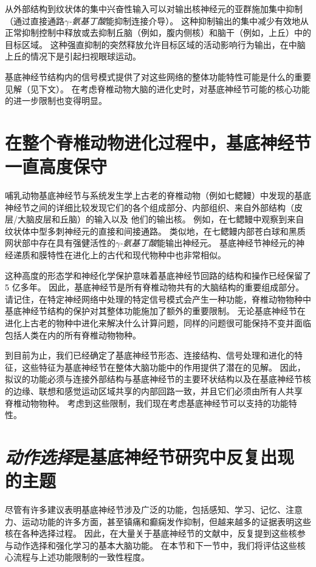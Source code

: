 从外部结构到纹状体的集中兴奋性输入可以对输出核神经元的亚群施加集中抑制（通过直接通路\textit{$\gamma$-氨基丁酸}能抑制连接介导）。
这种抑制输出的集中减少有效地从正常抑制控制中释放或去抑制丘脑（例如，腹内侧核）和脑干（例如，上丘）中的目标区域。
这种强直抑制的突然释放允许目标区域的活动影响行为输出，在中脑上丘的情况下是引起扫视眼球运动。


基底神经节结构内的信号模式提供了对这些网络的整体功能特性可能是什么的重要见解（见下文）。
在考虑脊椎动物大脑的进化史时，对基底神经节可能的核心功能的进一步限制也变得明显。



\section{在整个脊椎动物进化过程中，基底神经节一直高度保守}

哺乳动物基底神经节与系统发生学上古老的脊椎动物（例如七鳃鳗）中发现的基底神经节之间的详细比较发现它们的各个组成部分、内部组织、来自外部结构（皮层/大脑皮层和丘脑）的输入以及 他们的输出核。
例如，在七鳃鳗中观察到来自纹状体中型多刺神经元的直接和间接通路。
类似地，在七鳃鳗内部苍白球和黑质网状部中存在具有强健活性的\textit{$\gamma$-氨基丁酸}能输出神经元。
基底神经节神经元的神经递质和膜特性在进化上的古代和现代物种中也非常相似。


这种高度的形态学和神经化学保护意味着基底神经节回路的结构和操作已经保留了 5 亿多年。
因此，基底神经节是所有脊椎动物共有的大脑结构的重要组成部分。
请记住，在特定神经网络中处理的特定信号模式会产生一种功能，脊椎动物物种中基底神经节结构的保护对其整体功能施加了额外的重要限制。
无论基底神经节在进化上古老的物种中进化来解决什么计算问题，同样的问题很可能保持不变并面临包括人类在内的所有脊椎动物物种。


到目前为止，我们已经确定了基底神经节形态、连接结构、信号处理和进化的特征，这些特征为基底神经节在整体大脑功能中的作用提供了潜在的见解。
因此，拟议的功能必须与连接外部结构与基底神经节的主要环状结构以及在基底神经节核的边缘、联想和感觉运动区域共享的内部回路一致，并且它们必须由所有人共享 脊椎动物物种。
考虑到这些限制，我们现在考虑基底神经节可以支持的功能特性。



\section{\textit{动作选择}是基底神经节研究中反复出现的主题}

尽管有许多建议表明基底神经节涉及广泛的功能，包括感知、学习、记忆、注意力、运动功能的许多方面，甚至镇痛和癫痫发作抑制，但越来越多的证据表明这些核在各种选择过程。
因此，在大量关于基底神经节的文献中，反复提到这些核参与动作选择和强化学习的基本大脑功能。
在本节和下一节中，我们将评估这些核心流程与上述功能限制的一致性程度。




